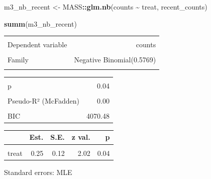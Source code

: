 \documentclass[
]{article}
\newenvironment{Shaded}{\begin{snugshade}}{\end{snugshade}}
\newcommand{\FunctionTok}[1]{\textcolor[rgb]{0.13,0.29,0.53}{\textbf{#1}}}
\newcommand{\NormalTok}[1]{#1}
\newcommand{\OtherTok}[1]{\textcolor[rgb]{0.56,0.35,0.01}{#1}}
\newcommand{\SpecialCharTok}[1]{\textcolor[rgb]{0.81,0.36,0.00}{\textbf{#1}}}
\begin{document}
\begin{Shaded}
\begin{Highlighting}[]
\NormalTok{m3\_nb\_recent }\OtherTok{\textless{}{-}}\NormalTok{ MASS}\SpecialCharTok{::}\FunctionTok{glm.nb}\NormalTok{(counts }\SpecialCharTok{\textasciitilde{}}\NormalTok{ treat,}
\NormalTok{               recent\_counts)}

\FunctionTok{summ}\NormalTok{(m3\_nb\_recent)}
\end{Highlighting}
\end{Shaded}

\begin{table}[!h]
\centering
\begin{tabular}{lr}
\toprule
\cellcolor{gray!10}{Observations} & \cellcolor{gray!10}{466}\\
Dependent variable & counts\\
\cellcolor{gray!10}{Type} & \cellcolor{gray!10}{Generalized linear model}\\
Family & Negative Binomial(0.5769)\\
\cellcolor{gray!10}{Link} & \cellcolor{gray!10}{log}\\
\bottomrule
\end{tabular}
\end{table} \begin{table}[!h]
\centering
\begin{tabular}{lr}
\toprule
\cellcolor{gray!10}{$\chi^2$(464)} & \cellcolor{gray!10}{4.08}\\
p & 0.04\\
\cellcolor{gray!10}{Pseudo-R² (Cragg-Uhler)} & \cellcolor{gray!10}{0.01}\\
Pseudo-R² (McFadden) & 0.00\\
\cellcolor{gray!10}{AIC} & \cellcolor{gray!10}{4058.04}\\
\addlinespace
BIC & 4070.48\\
\bottomrule
\end{tabular}
\end{table} \begin{table}[!h]
\centering
\begin{threeparttable}
\begin{tabular}{lrrrr}
\toprule
  & Est. & S.E. & z val. & p\\
\midrule
\cellcolor{gray!10}{(Intercept)} & \cellcolor{gray!10}{3.31} & \cellcolor{gray!10}{0.08} & \cellcolor{gray!10}{38.97} & \cellcolor{gray!10}{0.00}\\
treat & 0.25 & 0.12 & 2.02 & 0.04\\
\bottomrule
\end{tabular}
\begin{tablenotes}
\item Standard errors: MLE
\end{tablenotes}
\end{threeparttable}
\end{table}
\end{document}

